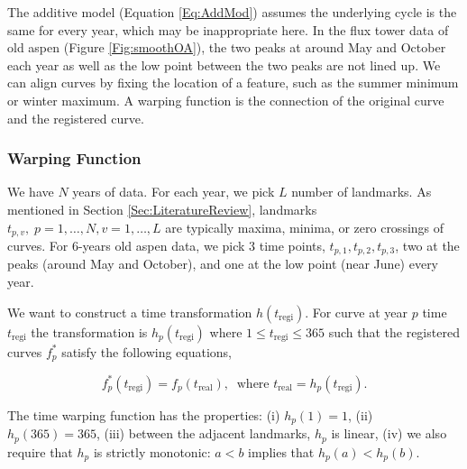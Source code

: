 \documentclass{article}\usepackage[]{graphicx}\usepackage[]{color}
\begin{document}
The additive model (Equation \ref{Eq:AddMod}) assumes the underlying cycle is the same for every year, which may be inappropriate here.  In the flux tower data of old aspen (Figure \ref{Fig:smoothOA}), the two peaks at around May and October each year as well as the low point between the two peaks are not lined up.
We can align curves by fixing the location of a feature, such as the summer  minimum or winter maximum. 
A warping function is the connection of the original curve and the registered curve.

\subsubsection{Warping Function}\label{Sec:Warping}


We have $N$ years of data. For each year, we pick $L$ number of landmarks.
As mentioned in Section \ref{Sec:LiteratureReview}, landmarks $t_{p,v},\;p=1,\dots,N,v=1,\dots,L$  are typically maxima, minima, or zero crossings of curves. For 6-years old aspen data, we pick 3 time points, $t_{p,1},t_{p,2},t_{p,3}$,  two at the peaks (around May and October), and one at the low point (near June) every year.

We want to construct a time transformation $h(t_\textrm{regi})$. For curve at year $p$ time $t_\textrm{regi}$ the transformation is $h_p(t_\textrm{regi})$ where $1 \le t_\textrm{regi} \le 365$ such that the registered curves $f^{*}_p$ satisfy the following equations,

\begin{equation}\label{eq:warping}
f^{*}_p(t_{\textrm{regi}}) = f_p(t_{\textrm{real}}),\;\;\textrm{where }t_{\textrm{real}}=h_p(t_\textrm{regi}).
\end{equation}

The time warping function has the properties: (i) $h_p(1) = 1$, (ii) $h_p(365) = 365$, (iii) between the adjacent landmarks,  $h_p$ is linear, (iv) we also require that $h_p$ is strictly monotonic: $a < b$ implies that $h_p(a) < h_p(b)$.
\end{document}
